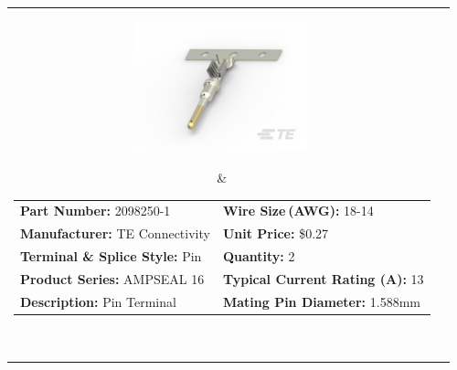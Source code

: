 \documentclass[12pt,letterpaper]{article}
\begin{document}
\begin{longtable}{c l}
\parbox[c]{5cm}{\includegraphics[width=5cm]{2098250-1.png} }
& \begin{tabular}{l l}
\textbf{Part Number:} 2098250-1 & \textbf{Wire Size (AWG):} 18-14 \\
\textbf{Manufacturer:} TE Connectivity & \textbf{Unit Price:} \$0.27 \\
\textbf{Terminal \& Splice Style:} Pin & \textbf{Quantity:} 2 \\
\textbf{Product Series:} AMPSEAL 16 & \textbf{Typical Current Rating (A):} 13 \\
\textbf{Description:} Pin Terminal  & \textbf{Mating Pin Diameter:} 1.588\si{\milli\meter} \\
\end{tabular} \\

\end{longtable}



\end{document}
